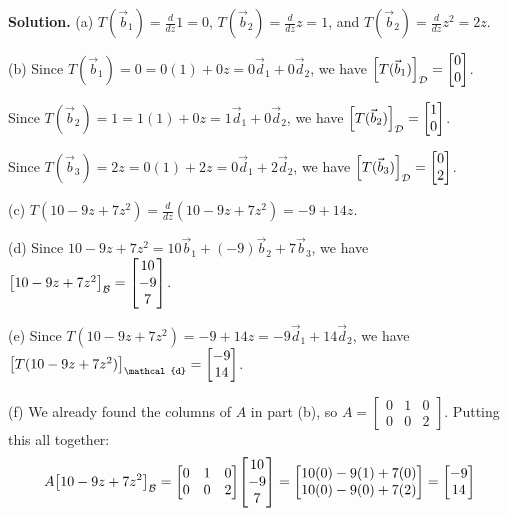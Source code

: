 \documentclass[11pt, letterpaper]{report}
\newenvironment{book}{}{}
\let\originalleft\left
\let\originalright\right
\renewcommand{\left}{\mathopen{}\mathclose\bgroup\originalleft}
\renewcommand{\right}{\aftergroup\egroup\originalright}
\newcommand{\bbvec}[2]{
  \begin{bmatrix} #1 \\ #2 \end{bmatrix}
}
\newcommand{\bbbvec}[3]{
  \begin{bmatrix} #1 \\ #2 \\ #3 \end{bmatrix}
}
\begin{document}
\begin{book}
\textbf{Solution.} (a) $T(\vec{b}_1) = \frac{d}{dz}1=0$, $T(\vec{b}_2) = \frac{d}{dz}z=1$, and $T(\vec{b}_2) = \frac{d}{dz}z^2=2z$.

(b) Since $T(\vec{b}_1) = 0 = 0(1) + 0z = 0\vec{d}_1+0\vec{d}_2$, we have $\left[ T(\vec{b}_1) \right]_{\mathcal{D}} = \bbvec{0}{0}$.

Since $T(\vec{b}_2) = 1 = 1(1) + 0z = 1\vec{d}_1+0\vec{d}_2$, we have $\left[ T(\vec{b}_2) \right]_{\mathcal{D}} = \bbvec{1}{0}$.

Since $T(\vec{b}_3) = 2z = 0(1) + 2z = 0\vec{d}_1+2\vec{d}_2$, we have $\left[ T(\vec{b}_3) \right]_{\mathcal{D}} = \bbvec{0}{2}$.

(c) $T(10-9z+7z^2) = \frac{d}{dz}(10-9z+7z^2) = -9+14z$.

(d) Since $10-9z+7z^2=10\vec{b}_1+(-9)\vec{b}_2+7\vec{b}_3$, we have $\left[ 10-9z+7z^2 \right]_{\mathcal{B}}=\bbbvec{10}{-9}{7}$.

(e) Since $T(10-9z+7z^2) = -9+14z = -9\vec{d}_1+14\vec{d}_2$, we have $\left[ T(10-9z+7z^2) \right]_{\mathcal{d}}=\bbvec{-9}{14}$.

(f) We already found the columns of $A$ in part (b), so $A = \begin{bmatrix}
0 & 1 & 0 \\
0 & 0 & 2
\end{bmatrix}$. Putting this all together:
\[A\left[10-9z+7z^2\right]_{\mathcal{B}} = \begin{bmatrix}
0 & 1 & 0 \\
0 & 0 & 2
\end{bmatrix} \bbbvec{10}{-9}{7} = \bbvec{10(0) -9(1)+7(0) }{10(0) -9(0)+7(2)} = \bbvec{-9}{14}\]


\end{book}
\end{document}
